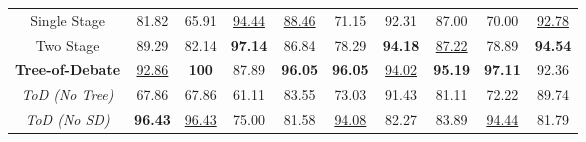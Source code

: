 \begin{table*}[ht]
{\begin{tabular}{|c|ccc|ccc|ccc|}
Single Stage   
& 81.82 & 65.91 & \underline{94.44} 
& \underline{88.46} & 71.15 & 92.31 
& 87.00 & 70.00 & \underline{92.78} \\

Two Stage      
& 89.29 & 82.14 & \textbf{97.14} 
& 86.84 & 78.29 & \textbf{94.18} 
& \underline{87.22} & 78.89 & \textbf{94.54} \\ \hline

\textbf{Tree-of-Debate}       
& \underline{92.86} & \textbf{100} & 87.89 
& \textbf{96.05} & \textbf{96.05} & \underline{94.02} 
& \textbf{95.19} & \textbf{97.11} & 92.36 \\

\textit{ToD (No Tree)}  
& 67.86 & 67.86 & 61.11 
& 83.55 & 73.03 & 91.43 
& 81.11 & 72.22 & 89.74 \\

\textit{ToD (No SD)} 
& \textbf{96.43} & \underline{96.43} & 75.00 
& 81.58 & \underline{94.08} & 82.27 
& 83.89 & \underline{94.44} & 81.79 \\ \hline

\end{tabular}%
}
\end{table*}


